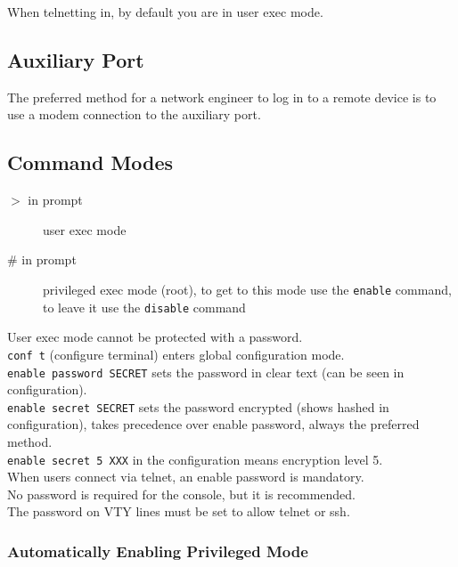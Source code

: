 When telnetting in, by default you are in user exec mode.

\subsection{Auxiliary Port}

The preferred method for a network engineer to log in to a remote device is
to use a modem connection to the auxiliary port.

\subsection{Command Modes}

\begin{description}

\item[$>$ in prompt]
user exec mode

\item[\# in prompt]
privileged exec mode (root), to get to this mode use the \texttt{enable}
command, to leave it use the \texttt{disable} command

\end{description}

User exec mode cannot be protected with a password.\\

\texttt{conf t} (configure terminal) enters global configuration mode.\\

\texttt{enable password SECRET} sets the password in clear text (can be seen
in configuration).\\

\texttt{enable secret SECRET} sets the password encrypted (shows hashed in
configuration), takes precedence over enable password, always the preferred
method.\\

\texttt{enable secret 5 XXX} in the configuration means encryption level 5.\\

When users connect via telnet, an enable password is mandatory.\\

No password is required for the console, but it is recommended.\\

The password on VTY lines must be set to allow telnet or ssh.

\subsubsection{Automatically Enabling Privileged Mode}

